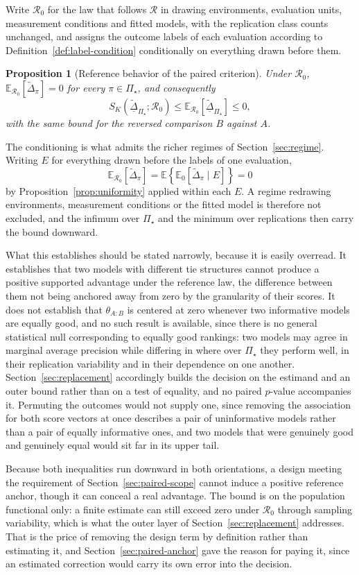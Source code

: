 \documentclass[11pt]{article}
\newcommand{\Regime}{\mathcal{R}}
\newcommand{\PSet}{\Pi_\star}
\newcommand{\E}{\mathbb{E}}
\newcommand{\Dta}{\widetilde{\Delta}}
\newcommand{\RobDta}{\underline{\widetilde{\Delta}}_{\PSet}}
\newtheorem{proposition}{Proposition}
\theoremstyle{remark}
\begin{document}
Write $\Regime_0$ for the law that follows $\Regime$ in drawing environments, evaluation units, measurement conditions and fitted models, with the replication class counts unchanged, and assigns the outcome labels of each evaluation according to Definition~\ref{def:label-condition} conditionally on everything drawn before them.

\begin{proposition}[Reference behavior of the paired criterion]
\label{prop:conservative}
Under $\Regime_0$, $\E_{\Regime_0}[\Dta_\pi]=0$ for every $\pi\in\PSet$, and consequently
\[
S_K(\RobDta;\Regime_0)
\leq
\E_{\Regime_0}[\RobDta]
\leq
0 ,
\]
with the same bound for the reversed comparison $B$ against $A$.
\end{proposition}

The conditioning is what admits the richer regimes of Section~\ref{sec:regime}. Writing $E$ for everything drawn before the labels of one evaluation,
\[
\E_{\Regime_0}\left[\Dta_\pi\right]
=
\E\left\{
\E_0\left[\Dta_\pi\mid E\right]
\right\}
=
0
\]
by Proposition~\ref{prop:uniformity} applied within each $E$. A regime redrawing environments, measurement conditions or the fitted model is therefore not excluded, and the infimum over $\PSet$ and the minimum over replications then carry the bound downward.

What this establishes should be stated narrowly, because it is easily overread. It establishes that two models with different tie structures cannot produce a positive supported advantage under the reference law, the difference between them not being anchored away from zero by the granularity of their scores. It does not establish that $\theta_{A:B}$ is centered at zero whenever two informative models are equally good, and no such result is available, since there is no general statistical null corresponding to equally good rankings: two models may agree in marginal average precision while differing in where over $\PSet$ they perform well, in their replication variability and in their dependence on one another. Section~\ref{sec:replacement} accordingly builds the decision on the estimand and an outer bound rather than on a test of equality, and no paired $p$-value accompanies it. Permuting the outcomes would not supply one, since removing the association for both score vectors at once describes a pair of uninformative models rather than a pair of equally informative ones, and two models that were genuinely good and genuinely equal would sit far in its upper tail.

Because both inequalities run downward in both orientations, a design meeting the requirement of Section~\ref{sec:paired-scope} cannot induce a positive reference anchor, though it can conceal a real advantage. The bound is on the population functional only: a finite estimate can still exceed zero under $\Regime_0$ through sampling variability, which is what the outer layer of Section~\ref{sec:replacement} addresses. That is the price of removing the design term by definition rather than estimating it, and Section~\ref{sec:paired-anchor} gave the reason for paying it, since an estimated correction would carry its own error into the decision.
\end{document}
